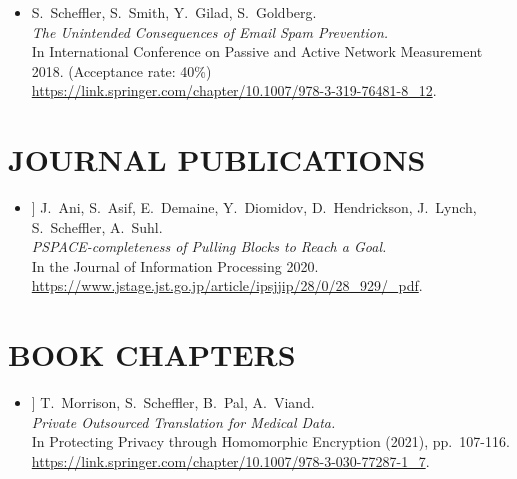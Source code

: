 \documentclass{res}
\begin{document}
\begin{resume}
\begin{itemize}
\item[\emailspam] S.~Scheffler, S.~Smith, Y.~Gilad, S.~Goldberg. \\
\emph{The Unintended Consequences of Email Spam Prevention.} \\
In International Conference on Passive and Active Network Measurement 2018. (Acceptance rate: 40\%) \\
\url{https://link.springer.com/chapter/10.1007/978-3-319-76481-8\_12}.
\end{itemize}

\vspace{0.25in}

\section{JOURNAL PUBLICATIONS}
\vspace{0.25in}

\newcommand{\pullingblocksJIP}{[13]\xspace}

\begin{itemize}
\item[\pullingblocksJIP] J.~Ani, S.~Asif, E.~Demaine, Y.~Diomidov, D.~Hendrickson, J.~Lynch, S.~Scheffler, A.~Suhl. \\
\emph{PSPACE-completeness of Pulling Blocks to Reach a Goal.} \\
In the Journal of Information Processing 2020.\\
\url{https://www.jstage.jst.go.jp/article/ipsjjip/28/0/28_929/_pdf}.
\end{itemize}

\vspace{0.25in}

\section{BOOK CHAPTERS}
\vspace{0.25in}

\newcommand{\privateTranslation}{[14]\xspace}

\begin{itemize}
\item[\privateTranslation] T.~Morrison, S.~Scheffler, B.~Pal, A.~Viand. \\
\emph{Private Outsourced Translation for Medical Data.} \\
In Protecting Privacy through Homomorphic Encryption (2021), pp.~107-116. \\
\url{https://link.springer.com/chapter/10.1007/978-3-030-77287-1_7}.
\end{itemize}


\end{resume}
\end{document}
